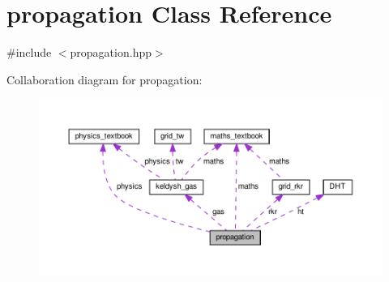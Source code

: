 \hypertarget{classpropagation}{}\section{propagation Class Reference}
\label{classpropagation}


{\ttfamily \#include $<$propagation.\+hpp$>$}



Collaboration diagram for propagation\+:
\nopagebreak
\begin{figure}[H]
\begin{center}
\leavevmode
\includegraphics[width=350pt]{classpropagation__coll__graph}
\end{center}
\end{figure}
